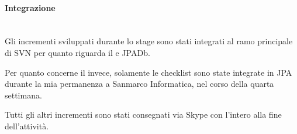\paragraph{Integrazione} \mbox{} \\

Gli incrementi sviluppati durante lo stage sono stati integrati al ramo
principale di SVN per quanto riguarda il \BKEND{} e JPADb.

Per quanto concerne il \FREND{} invece, solamente le checklist sono state
integrate in JPA durante la mia permanenza a Sanmarco Informatica, nel corso
della quarta settimana.

Tutti gli altri incrementi sono stati consegnati via Skype con l'intero
 alla fine dell'attività.
